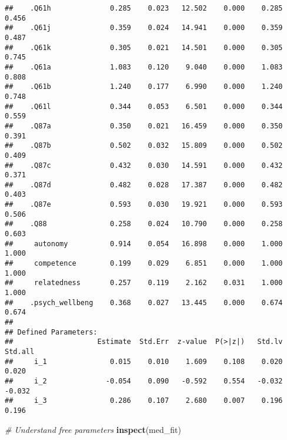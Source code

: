 \documentclass[
]{article}
\newenvironment{Shaded}{\begin{snugshade}}{\end{snugshade}}
\newcommand{\CommentTok}[1]{\textcolor[rgb]{0.56,0.35,0.01}{\textit{#1}}}
\newcommand{\KeywordTok}[1]{\textcolor[rgb]{0.13,0.29,0.53}{\textbf{#1}}}
\newcommand{\NormalTok}[1]{#1}
\begin{document}
\begin{verbatim}
##    .Q61h              0.285    0.023   12.502    0.000    0.285    0.456
##    .Q61j              0.359    0.024   14.941    0.000    0.359    0.487
##    .Q61k              0.305    0.021   14.501    0.000    0.305    0.745
##    .Q61a              1.083    0.120    9.040    0.000    1.083    0.808
##    .Q61b              1.240    0.177    6.990    0.000    1.240    0.748
##    .Q61l              0.344    0.053    6.501    0.000    0.344    0.559
##    .Q87a              0.350    0.021   16.459    0.000    0.350    0.391
##    .Q87b              0.502    0.032   15.809    0.000    0.502    0.409
##    .Q87c              0.432    0.030   14.591    0.000    0.432    0.371
##    .Q87d              0.482    0.028   17.387    0.000    0.482    0.403
##    .Q87e              0.593    0.030   19.921    0.000    0.593    0.506
##    .Q88               0.258    0.024   10.790    0.000    0.258    0.603
##     autonomy          0.914    0.054   16.898    0.000    1.000    1.000
##     competence        0.199    0.029    6.851    0.000    1.000    1.000
##     relatedness       0.257    0.119    2.162    0.031    1.000    1.000
##    .psych_wellbeng    0.368    0.027   13.445    0.000    0.674    0.674
## 
## Defined Parameters:
##                    Estimate  Std.Err  z-value  P(>|z|)   Std.lv  Std.all
##     i_1               0.015    0.010    1.609    0.108    0.020    0.020
##     i_2              -0.054    0.090   -0.592    0.554   -0.032   -0.032
##     i_3               0.286    0.107    2.680    0.007    0.196    0.196
\end{verbatim}

\begin{Shaded}
\begin{Highlighting}[]
\CommentTok{# Understand free parameters}
\KeywordTok{inspect}\NormalTok{(med_fit)}
\end{Highlighting}
\end{Shaded}
\end{document}
